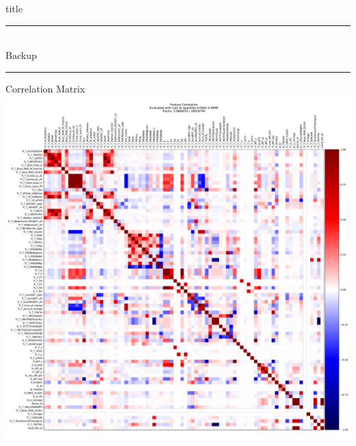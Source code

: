 \documentclass[aspectratio=1610, 10pt]{beamer}
\begin{document}
\begin{frame}[plain]
  \centering
  \begin{beamercolorbox}[center, wd=\textwidth]{title}
    \textcolor{tugreen}{\rule{\textwidth}{1pt}}\\[0.5\baselineskip]%
    Backup
    \textcolor{tugreen}{\rule{\textwidth}{1pt}}%
  \end{beamercolorbox}%
\end{frame}

\begin{frame}{Correlation Matrix}
  \centering
  \includegraphics[height=0.9\textheight]{images/backup/correlation_matrix.pdf}
\end{frame}
\end{document}
